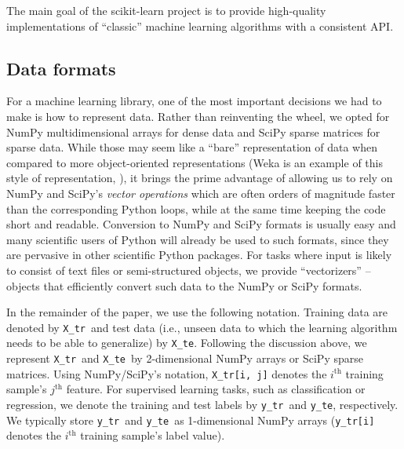 \documentclass[a4paper]{article}
\newcommand{\Xtr}{\texttt{X\_tr}}
\newcommand{\Xte}{\texttt{X\_te}}
\newcommand{\ytr}{\texttt{y\_tr}}
\newcommand{\yte}{\texttt{y\_te}}
\begin{document}
The main goal of the scikit-learn project
is to provide high-quality implementations
of ``classic'' machine learning algorithms
with a consistent API.

\subsection{Data formats}

For a machine learning library, one of the most important decisions we had to
make is how to represent data.  Rather than reinventing the wheel, we opted for
NumPy multidimensional arrays  for dense data and SciPy
sparse matrices for sparse data.  While those may seem like a ``bare''
representation of data when compared to more object-oriented representations
(Weka is an example of this style of representation, \citealp{hall2009weka}),
it brings the prime advantage of allowing us to rely on NumPy and SciPy's
\textit{vector operations} which are often orders of magnitude faster
than the corresponding Python loops,
while at the same time keeping the code short and readable.
Conversion to NumPy and SciPy formats is usually easy and many scientific users
of Python will already be used to such formats, since they are pervasive in
other scientific Python packages.  For tasks where input is likely to consist
of text files or semi-structured objects, we provide ``vectorizers'' -- objects
that efficiently convert such data to the NumPy or SciPy formats.

In the remainder of the paper, we use the following notation. Training data are
denoted by \Xtr ~and test data (i.e., unseen data to which the learning
algorithm needs to be able to generalize) by \Xte.  Following the discussion above,
we represent \Xtr ~and \Xte ~by 2-dimensional NumPy arrays or SciPy sparse
matrices. Using NumPy/SciPy's notation, \Xtr\texttt{[i, j]} denotes the
$i^\textrm{th}$ training sample's $j^\textrm{th}$ feature. For supervised learning tasks,
such as classification or regression, we denote the training and test labels by
\ytr ~and \yte, respectively. We typically store \ytr ~and \yte ~as
1-dimensional NumPy arrays (\ytr\texttt{[i]} denotes the $i^\textrm{th}$ training
sample's label value).
\end{document}
